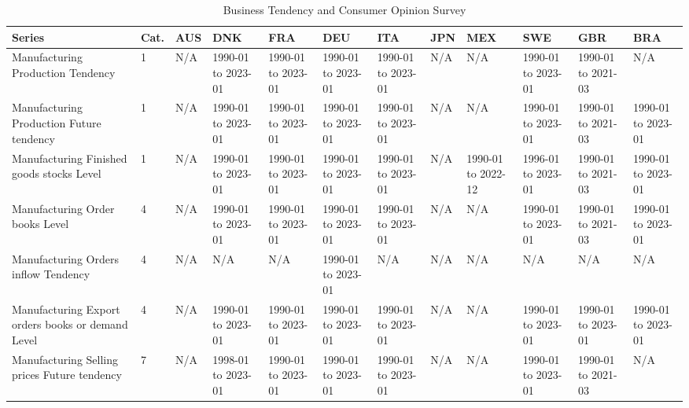 \begin{table}
\centering
\caption{Business Tendency and Consumer Opinion Survey}
\begin{tabular}{@{}llYYYYYYYY@{}}
\toprule
                                            Series &  Cat. &                AUS &                DNK &                FRA &                DEU &                ITA &                JPN &                MEX &                SWE &                GBR &                BRA \\
\midrule
                Manufacturing  Production Tendency &     1 &                N/A & 1990-01 to 2023-01 & 1990-01 to 2023-01 & 1990-01 to 2023-01 & 1990-01 to 2023-01 &                N/A &                N/A & 1990-01 to 2023-01 & 1990-01 to 2021-03 &                N/A \\
         Manufacturing  Production Future tendency &     1 &                N/A & 1990-01 to 2023-01 & 1990-01 to 2023-01 & 1990-01 to 2023-01 & 1990-01 to 2023-01 &                N/A &                N/A & 1990-01 to 2023-01 & 1990-01 to 2021-03 & 1990-01 to 2023-01 \\
        Manufacturing  Finished goods stocks Level &     1 &                N/A & 1990-01 to 2023-01 & 1990-01 to 2023-01 & 1990-01 to 2023-01 & 1990-01 to 2023-01 &                N/A & 1990-01 to 2022-12 & 1996-01 to 2023-01 & 1990-01 to 2021-03 & 1990-01 to 2023-01 \\
                  Manufacturing  Order books Level &     4 &                N/A & 1990-01 to 2023-01 & 1990-01 to 2023-01 & 1990-01 to 2023-01 & 1990-01 to 2023-01 &                N/A &                N/A & 1990-01 to 2023-01 & 1990-01 to 2021-03 & 1990-01 to 2023-01 \\
             Manufacturing  Orders inflow Tendency &     4 &                N/A &                N/A &                N/A & 1990-01 to 2023-01 &                N/A &                N/A &                N/A &                N/A &                N/A &                N/A \\
Manufacturing  Export orders books or demand Level &     4 &                N/A & 1990-01 to 2023-01 & 1990-01 to 2023-01 & 1990-01 to 2023-01 & 1990-01 to 2023-01 &                N/A &                N/A & 1990-01 to 2023-01 & 1990-01 to 2023-01 & 1990-01 to 2023-01 \\
     Manufacturing  Selling prices Future tendency &     7 &                N/A & 1998-01 to 2023-01 & 1990-01 to 2023-01 & 1990-01 to 2023-01 & 1990-01 to 2023-01 &                N/A &                N/A & 1990-01 to 2023-01 & 1990-01 to 2021-03 &                N/A \\

\end{tabular}
\end{table}
